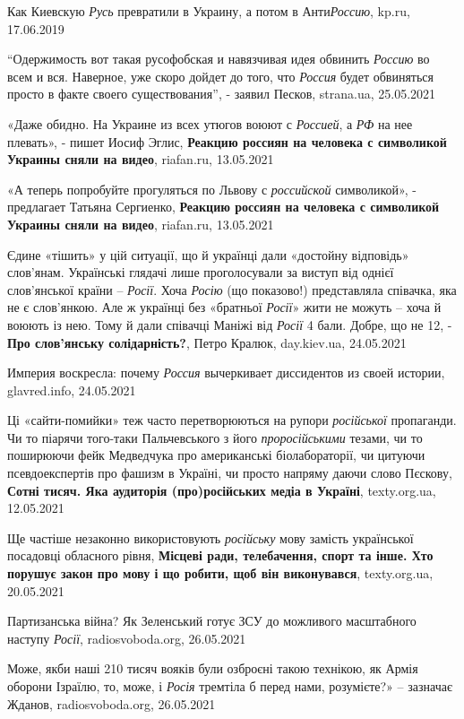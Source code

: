 Как Киевскую \emph{Русь} превратили в Украину, а потом в Анти\emph{Россию},
kp.ru, 17.06.2019

\enquote{Одержимость вот такая русофобская и навязчивая идея обвинить \emph{Россию} во всем и
вся. Наверное, уже скоро дойдет до того, что \emph{Россия} будет обвиняться просто в
факте своего существования}, - заявил Песков, strana.ua, 25.05.2021

«Даже обидно. На Украине из всех утюгов воюют с \emph{Россией}, а \emph{РФ} на нее плевать», - пишет Иосиф Эглис,
\textbf{Реакцию россиян на человека с символикой Украины сняли на видео}, riafan.ru, 13.05.2021

«А теперь попробуйте прогуляться по Львову с \emph{российской} символикой», - предлагает Татьяна Сергиенко,
\textbf{Реакцию россиян на человека с символикой Украины сняли на видео}, riafan.ru, 13.05.2021

Єдине «тішить» у цій ситуації, що й українці дали «достойну відповідь»
слов'янам. Українські глядачі лише проголосували за виступ від однієї
слов'янської країни – \emph{Росії}. Хоча \emph{Росію} (що показово!) представляла співачка,
яка не є слов'янкою. Але ж українці без «братньої \emph{Росії}» жити не можуть
– хоча й воюють із нею. Тому й дали співачці Маніжі від \emph{Росії} 4 бали.
Добре, що не 12, - \textbf{Про слов'янську солідарність?}, Петро Кралюк, day.kiev.ua,
24.05.2021

Империя воскресла: почему \emph{Россия} вычеркивает диссидентов из своей
истории, glavred.info, 24.05.2021

Ці «сайти-помийки» теж часто перетворюються на рупори \emph{російської}
пропаганди. Чи то піарячи того-таки Пальчевського з його \emph{проросійськими}
тезами, чи то поширюючи фейк Медведчука про американські біолабораторії, чи
цитуючи псевдоекспертів про фашизм в Україні, чи просто напряму даючи слово
Пєскову, \textbf{Сотні тисяч. Яка аудиторія (про)російських медіа в Україні},
texty.org.ua, 12.05.2021

Ще частіше незаконно використовують \emph{російську} мову замість української
посадовці обласного рівня, \textbf{Місцеві ради, телебачення, спорт та інше.
Хто порушує закон про мову і що робити, щоб він виконувався}, texty.org.ua,
20.05.2021

Партизанська війна? Як Зеленський готує ЗСУ до можливого масштабного наступу
\emph{Росії}, radiosvoboda.org, 26.05.2021

Може, якби наші 210 тисяч вояків були озброєні такою технікою, як Армія оборони
Ізраїлю, то, може, і \emph{Росія} тремтіла б перед нами, розумієте?» – зазначає
Жданов, radiosvoboda.org, 26.05.2021

